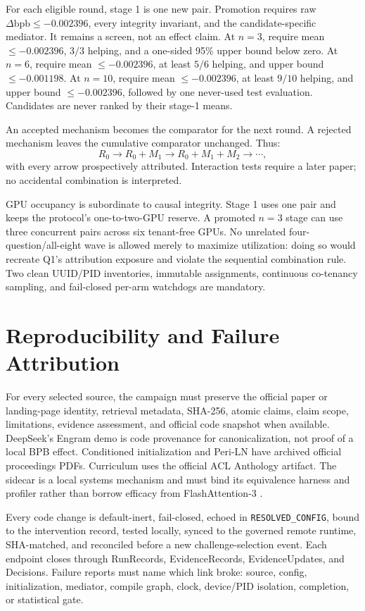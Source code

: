 \documentclass{article}
\newcommand{\bpb}{\mathrm{bpb}}
\begin{document}
For each eligible round, stage 1 is one new pair.  Promotion requires raw
$\Delta\bpb\leq-0.002396$, every integrity invariant, and the
candidate-specific mediator.  It remains a screen, not an effect claim.
At $n=3$, require mean $\leq-0.002396$, $3/3$ helping, and a one-sided 95\%
upper bound below zero.  At $n=6$, require mean $\leq-0.002396$, at least
$5/6$ helping, and upper bound $\leq-0.001198$.  At $n=10$, require mean
$\leq-0.002396$, at least $9/10$ helping, and upper bound
$\leq-0.002396$, followed by one never-used test evaluation.  Candidates are
never ranked by their stage-1 means.

An accepted mechanism becomes the comparator for the next round.  A rejected
mechanism leaves the cumulative comparator unchanged.  Thus:
\[
R_0 \rightarrow R_0{+}M_1 \rightarrow
R_0{+}M_1{+}M_2 \rightarrow \cdots ,
\]
with every arrow prospectively attributed.  Interaction tests require a
later paper; no accidental combination is interpreted.

GPU occupancy is subordinate to causal integrity.  Stage 1 uses one pair and
keeps the protocol's one-to-two-GPU reserve.  A promoted $n=3$ stage can use
three concurrent pairs across six tenant-free GPUs.  No unrelated
four-question/all-eight wave is allowed merely to maximize utilization:
doing so would recreate Q1's attribution exposure and violate the sequential
combination rule.  Two clean UUID/PID inventories, immutable assignments,
continuous co-tenancy sampling, and fail-closed per-arm watchdogs are
mandatory.

\section{Reproducibility and Failure Attribution}

For every selected source, the campaign must preserve the official paper or
landing-page identity, retrieval metadata, SHA-256, atomic claims, claim
scope, limitations, evidence assessment, and official code snapshot when
available.  DeepSeek's Engram demo is code provenance for canonicalization,
not proof of a local BPB effect.  Conditioned initialization and Peri-LN have
archived official proceedings PDFs.  Curriculum uses the official ACL
Anthology artifact.  The sidecar is a local systems mechanism and must bind
its equivalence harness and profiler rather than borrow efficacy from
FlashAttention-3 \cite{dao2024fa3}.

Every code change is default-inert, fail-closed, echoed in
\texttt{RESOLVED\_CONFIG}, bound to the intervention record, tested locally,
synced to the governed remote runtime, SHA-matched, and reconciled before a
new challenge-selection event.  Each endpoint closes through RunRecords,
EvidenceRecords, EvidenceUpdates, and Decisions.  Failure reports must name
which link broke: source, config, initialization, mediator, compile graph,
clock, device/PID isolation, completion, or statistical gate.
\end{document}
